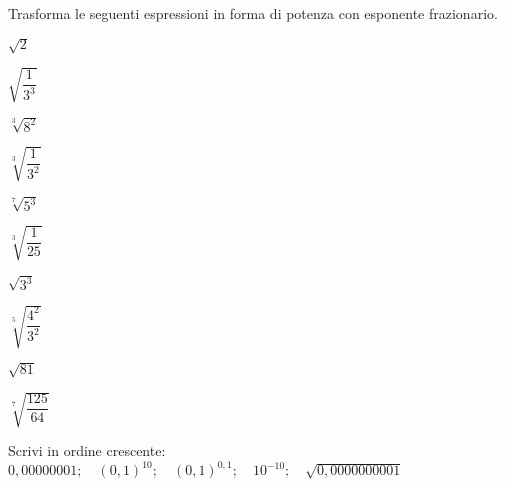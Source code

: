\begin{esercizio}[\Ast]
 \label{ese:2.18}
Trasforma le seguenti espressioni in forma di potenza con esponente 
frazionario.
\vspace{-.5em}
 \begin{multicols}{5}
 \begin{enumeratea}
 \item $\sqrt 2$
 \item $\sqrt{\dfrac {1}{3^3}}$
 \item $\sqrt[3]{8^2}$
 \item $\sqrt[3]{\dfrac {1}{3^2}}$
 \item $\sqrt[7]{5^3}$
 \item $\sqrt[3]{\dfrac {1}{25}}$
 \item $\sqrt{3^3}$
 \item $\sqrt[5]{\dfrac{4^2}{3^2}}$
 \item $\sqrt{81}$
 \item $\sqrt[7]{\dfrac {125}{64}}$
 \end{enumeratea}
 \end{multicols}
\end{esercizio}


% 


\begin{esercizio}
 \label{ese:2.20}
Scrivi in ordine crescente:
 \(0,00000001;\quad (0,1)^{10};\quad (0,1)^{0,1};\quad 10^{-10};
 \quad \sqrt{0,0000000001}\)
\end{esercizio}

